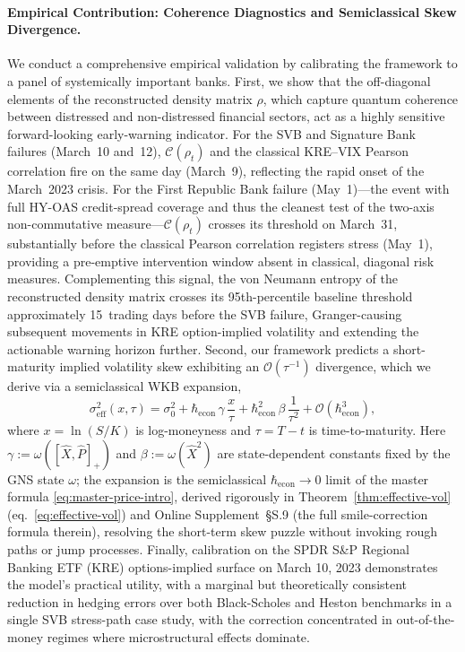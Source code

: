 \paragraph{Empirical Contribution: Coherence Diagnostics and Semiclassical Skew
Divergence.} We conduct a comprehensive empirical validation by calibrating the
framework to a panel of systemically important banks. First, we show that the
off-diagonal elements of the reconstructed density matrix $\rho$, which capture
quantum coherence between distressed and non-distressed financial sectors, act as a
highly sensitive forward-looking early-warning indicator. For the SVB and Signature
Bank failures (March~10 and~12), $\mathcal{C}(\rho_t)$ and the classical
KRE--VIX Pearson correlation fire on the same day (March~9), reflecting the
rapid onset of the March~2023 crisis. For the First Republic Bank failure
(May~1)---the event with full HY-OAS credit-spread coverage and thus the cleanest
test of the two-axis non-commutative measure---$\mathcal{C}(\rho_t)$ crosses its
threshold on March~31, substantially before the classical Pearson
correlation registers stress (May~1), providing a pre-emptive intervention window
absent in classical, diagonal risk measures. Complementing this signal, the von Neumann entropy of the reconstructed
density matrix crosses its 95th-percentile baseline threshold approximately
15~trading days before the SVB failure, Granger-causing subsequent movements in
KRE option-implied volatility and extending the actionable warning horizon further. Second, our framework predicts a short-maturity implied volatility skew
exhibiting an $\mathcal{O}(\tau^{-1})$ divergence, which we derive via a semiclassical
WKB expansion,
\begin{equation}\label{eq:skew-expansion-intro}
    \sigma^2_{\mathrm{eff}}(x, \tau) = \sigma_0^2
        + \hbar_{\mathrm{econ}} \, \gamma \, \frac{x}{\tau}
        + \hbar_{\mathrm{econ}}^2 \, \beta \, \frac{1}{\tau^2}
        + \mathcal{O}(\hbar_{\mathrm{econ}}^3),
\end{equation}
where $x = \ln(S/K)$ is log-moneyness and $\tau = T - t$ is time-to-maturity. Here
$\gamma := \omega([\hat{X}, \hat{P}]_+)$ and $\beta := \omega(\hat{X}^2)$ are
state-dependent constants fixed by the GNS state $\omega$; the expansion is the
semiclassical $\hbar_{\mathrm{econ}} \to 0$ limit of the master formula
\eqref{eq:master-price-intro}, derived rigorously in Theorem~\ref{thm:effective-vol}
(eq.~\eqref{eq:effective-vol}) and Online Supplement~\S{S.9}
(the full smile-correction formula therein), resolving the short-term skew puzzle without
invoking rough paths or jump processes. Finally, calibration on the SPDR S\&P
Regional Banking ETF (KRE) options-implied surface on March 10, 2023 demonstrates
the model's practical utility, with a marginal but theoretically consistent
reduction in hedging errors over both Black-Scholes and Heston benchmarks in
a single SVB stress-path case study, with the correction concentrated in
out-of-the-money regimes where microstructural effects dominate.

